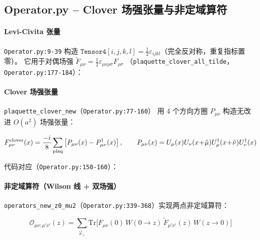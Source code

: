\documentclass[UTF8]{ctexart}
\begin{document}
\subsection{Operator.py -- Clover 场强张量与非定域算符}

\paragraph{Levi-Civita 张量} \texttt{Operator.py:9-39} 构造
$\texttt{Tensor4}[i,j,k,l] = \tfrac12\varepsilon_{ijkl}$（完全反对称，重复指标置零）。
它用于对偶场强 $\tilde F_{\mu\nu}=\tfrac12\varepsilon_{\mu\nu\rho\sigma}F_{\rho\sigma}$
（\texttt{plaquette\_clover\_all\_tilde}，\texttt{Operator.py:177-184}）：



\paragraph{Clover 场强张量} \texttt{plaquette\_clover\_new}（\texttt{Operator.py:77-160}）
用 4 个方向方圈 $P_{\mu\nu}$ 构造无改进 $O(a^2)$ 场强张量：

\begin{equation}
  F_{\mu\nu}^{\rm clover}(x) = \frac{-i}{8}\sum_{\mathrm{plaq}}
  \left[P_{\mu\nu}(x) - P_{\mu\nu}^\dagger(x)\right],\qquad
  P_{\mu\nu}(x)=U_\mu(x)U_\nu(x\!+\!\hat\mu)U_\mu^\dagger(x\!+\!\hat\nu)U_\nu^\dagger(x)
\end{equation}

代码对应（\texttt{Operator.py:150-160}）：



\paragraph{非定域算符（Wilson 线 + 双场强）}
\texttt{operators\_new\_z0\_mu2}（\texttt{Operator.py:339-368}）实现两点非定域算符：

\begin{equation}
  \mathcal{O}_{\mu\nu;\mu'\nu'}(z) = \sum_{\vec x_\perp}\mathrm{Tr}\Big[
    F_{\mu\nu}(0)\, W(0\!\to\!z)\, \tilde F_{\mu'\nu'}(z)\, W(z\!\to\!0)\Big]
\end{equation}


\end{document}
